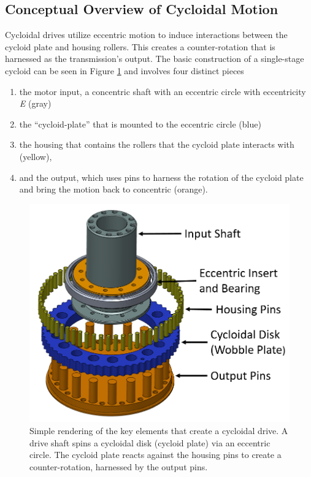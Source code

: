 \subsection{Conceptual Overview of Cycloidal Motion} \label{ch:design:basic_calc:overview}

Cycloidal drives utilize eccentric motion to induce interactions between the cycloid plate and housing rollers. This creates a counter-rotation that is harnessed as the transmission's output. The basic construction of a single-stage cycloid can be seen in Figure \ref{fig:single_cartoon} and involves four distinct pieces
\begin{enumerate}
	\item the motor input, a concentric shaft with an eccentric circle with eccentricity \textit{E} (gray)
	\item the ``cycloid-plate'' that is mounted to the eccentric circle (blue)
	\item the housing that contains the rollers that the cycloid plate interacts with (yellow),
	\item and the output, which uses pins to harness the rotation of the cycloid plate and bring the motion back to concentric (orange).
\end{enumerate}

\begin{figure}[t]
   \centering
   \includegraphics[width=0.60\linewidth]{fig/cycloid_cartoon_v2}
   \caption{Simple rendering of the key elements that create a cycloidal drive.
   A drive shaft spins a cycloidal disk (cycloid plate) via an eccentric circle.
   The cycloid plate reacts against the housing pins to create a counter-rotation, harnessed by the output pins.}
   \label{fig:single_cartoon}
\end{figure}

